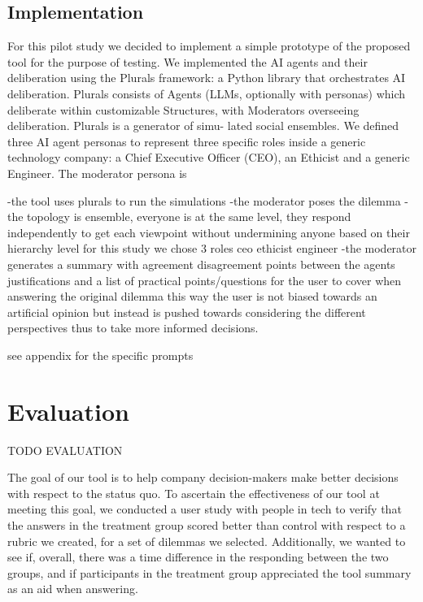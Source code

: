 \documentclass[sigconf, authorversion, nonacm, screen]{acmart}
\begin{document}
\subsection{Implementation}

For this pilot study we decided to implement a simple prototype of the proposed tool for the purpose of testing.
We implemented the AI agents and their deliberation using the Plurals framework: a Python library that orchestrates 
AI deliberation. Plurals consists of Agents (LLMs, optionally with
personas) which deliberate within customizable Structures, with
Moderators overseeing deliberation. Plurals is a generator of simu-
lated social ensembles.
We defined three AI agent personas to represent three specific roles inside a generic technology company: a Chief Executive Officer (CEO), an Ethicist and a generic Engineer.
The moderator persona is 

-the tool uses plurals to run the simulations
-the moderator poses the dilemma
-the topology is ensemble, everyone is at the same level, they respond independently to get each viewpoint without undermining anyone based on their hierarchy level
for this study we chose 3 roles ceo ethicist engineer
-the moderator generates a summary with agreement disagreement points between the agents justifications and a list of practical points/questions for the user to cover when answering the original dilemma
this way the user is not biased towards an artificial opinion but instead is pushed towards considering the different perspectives thus to take more informed decisions.

see appendix for the specific prompts

\section{Evaluation}

TODO EVALUATION

The goal of our tool is to help company decision-makers make better decisions with respect to the status quo.
To ascertain the effectiveness of our tool at meeting this goal, we conducted a user study with people in tech to verify that the answers in the treatment group scored better than control with respect to a rubric we created, for a set of dilemmas we selected.
Additionally, we wanted to see if, overall, there was a time difference in the responding between the two groups, and if participants in the treatment group appreciated the tool summary as an aid when answering.
\end{document}
